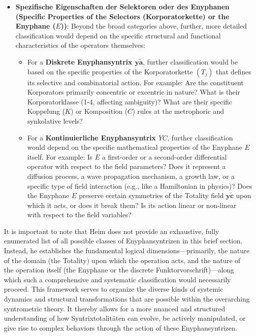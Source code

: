 \documentclass[12pt]{article}
\newcommand{\diskreteEnyphansyntrix}{\bm{y\widetilde{a}}}
\newcommand{\kontinuierlicheEnyphansyntrix}{YC}
\newcommand{\enyphane}{E}
\begin{document}
\begin{enumerate}
\begin{itemize}
        \item \textbf{Spezifische Eigenschaften der Selektoren oder des Enyphanen (Specific Properties of the Selectors (Korporatorkette) or the Enyphane (\(\enyphane\)))}: Beyond the broad categories above, further, more detailed classification would depend on the specific structural and functional characteristics of the operators themselves:
        \begin{itemize}
            \item For a \textbf{Diskrete Enyphansyntrix \( \diskreteEnyphansyntrix \)}, further classification would be based on the specific properties of the Korporatorkette \( (T_j) \) that defines its selective and combinatorial action. For example: Are the constituent Korporators primarily concentric or excentric in nature? What is their Korporatorklasse (1-4, affecting ambiguity)? What are their specific Koppelung (\(K\)) or Komposition (\(C\)) rules at the metrophoric and synkolative levels?
            \item For a \textbf{Kontinuierliche Enyphansyntrix \( \kontinuierlicheEnyphansyntrix \)}, further classification would depend on the specific mathematical properties of the Enyphane \( \enyphane \) itself. For example: Is \( \enyphane \) a first-order or a second-order differential operator with respect to the field parameters? Does it represent a diffusion process, a wave propagation mechanism, a growth law, or a specific type of field interaction (e.g., like a Hamiltonian in physics)? Does the Enyphane \( \enyphane \) preserve certain symmetries of the Totality field \( \mathbf{y\widetilde{c}} \) upon which it acts, or does it break them? Is its action linear or non-linear with respect to the field variables?
        \end{itemize}
    \end{itemize}
\end{enumerate}
It is important to note that Heim does not provide an exhaustive, fully enumerated list of all possible classes of Enyphansyntrizen in this brief section. Instead, he establishes the fundamental logical dimensions—primarily, the nature of the domain (the Totality) upon which the operation acts, and the nature of the operation itself (the Enyphane or the discrete Funktorvorschrift)—along which such a comprehensive and systematic classification would necessarily proceed. This framework serves to organize the diverse kinds of systemic dynamics and structural transformations that are possible within the overarching syntrometric theory. It thereby allows for a more nuanced and structured understanding of how Syntrixtotalitäten can evolve, be actively manipulated, or give rise to complex behaviors through the action of these Enyphansyntrizen.
\end{document}
